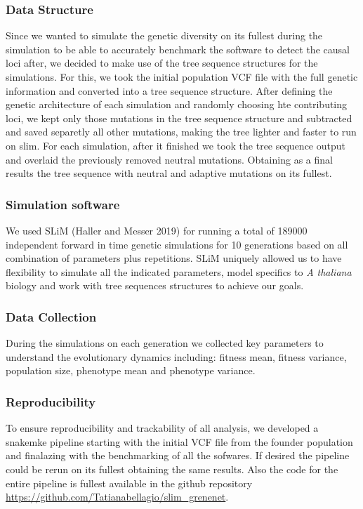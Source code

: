 \documentclass{article}
\begin{document}
\subsubsection{Data Structure}
Since we wanted to simulate the genetic diversity on its fullest during the simulation to be able to accurately benchmark the software to detect the causal loci after, we decided to make use of the tree sequence structures for the simulations. For this, we took the initial population VCF file with the full genetic information and converted into a tree sequence structure. After defining the genetic architecture of each simulation and randomly choosing hte contributing loci, we kept only those mutations in the tree sequence structure and subtracted and saved separetly all other mutations, making the tree lighter and faster to run on slim. For each simulation, after it finished we took the tree sequence output and overlaid the previously removed neutral mutations. Obtaining as a final results the tree sequence with neutral and adaptive mutations on its fullest. 

\subsubsection{Simulation software}
We used SLiM (Haller and Messer 2019) for running a total of 189000 independent forward in time genetic simulations for 10 generations based on all combination of parameters plus repetitions. SLiM uniquely allowed us to have flexibility to simulate all the indicated parameters, model specifics to \textit{A thaliana} biology and work with tree sequences structures to achieve our goals. 

\subsubsection{Data Collection}
During the simulations on each generation we collected key parameters to understand the evolutionary dynamics including: fitness mean, fitness variance, population size, phenotype mean and phenotype variance. 

\subsubsection{Reproducibility}
To ensure reproducibility and trackability of all analysis, we developed a snakemke pipeline starting with the initial VCF file from the founder population and finalazing with the benchmarking of all the sofwares. If desired the pipeline could be rerun on its fullest obtaining the same results. Also the code for the entire pipeline is fullest available in the github repository \url{https://github.com/Tatianabellagio/slim_grenenet}.
\end{document}
